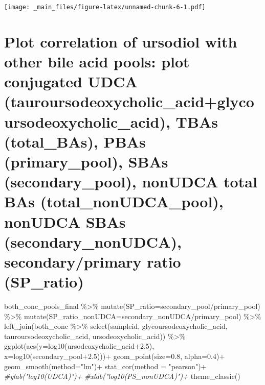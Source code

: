 \documentclass[
]{book}
\newenvironment{Shaded}{\begin{snugshade}}{\end{snugshade}}
\newcommand{\AttributeTok}[1]{\textcolor[rgb]{0.77,0.63,0.00}{#1}}
\newcommand{\CommentTok}[1]{\textcolor[rgb]{0.56,0.35,0.01}{\textit{#1}}}
\newcommand{\FloatTok}[1]{\textcolor[rgb]{0.00,0.00,0.81}{#1}}
\newcommand{\FunctionTok}[1]{\textcolor[rgb]{0.00,0.00,0.00}{#1}}
\newcommand{\NormalTok}[1]{#1}
\newcommand{\SpecialCharTok}[1]{\textcolor[rgb]{0.00,0.00,0.00}{#1}}
\newcommand{\StringTok}[1]{\textcolor[rgb]{0.31,0.60,0.02}{#1}}
\begin{document}
\texttt{[image: \_main\_files/figure-latex/unnamed-chunk-6-1.pdf]}

\hypertarget{plot-correlation-of-ursodiol-with-other-bile-acid-pools-plot-conjugated-udca-tauroursodeoxycholic_acidglycoursodeoxycholic_acid-tbas-total_bas-pbas-primary_pool-sbas-secondary_pool-nonudca-total-bas-total_nonudca_pool-nonudca-sbas-secondary_nonudca-secondaryprimary-ratio-sp_ratio}{%
\section{Plot correlation of ursodiol with other bile acid pools: plot conjugated UDCA (tauroursodeoxycholic\_acid+glycoursodeoxycholic\_acid), TBAs (total\_BAs), PBAs (primary\_pool), SBAs (secondary\_pool), nonUDCA total BAs (total\_nonUDCA\_pool), nonUDCA SBAs (secondary\_nonUDCA), secondary/primary ratio (SP\_ratio)}\label{plot-correlation-of-ursodiol-with-other-bile-acid-pools-plot-conjugated-udca-tauroursodeoxycholic_acidglycoursodeoxycholic_acid-tbas-total_bas-pbas-primary_pool-sbas-secondary_pool-nonudca-total-bas-total_nonudca_pool-nonudca-sbas-secondary_nonudca-secondaryprimary-ratio-sp_ratio}}

\begin{Shaded}
\begin{Highlighting}[]
\NormalTok{both\_conc\_pools\_final }\SpecialCharTok{\%\textgreater{}\%} 
  \FunctionTok{mutate}\NormalTok{(}\AttributeTok{SP\_ratio=}\NormalTok{secondary\_pool}\SpecialCharTok{/}\NormalTok{primary\_pool) }\SpecialCharTok{\%\textgreater{}\%} 
  \FunctionTok{mutate}\NormalTok{(}\AttributeTok{SP\_ratio\_nonUDCA=}\NormalTok{secondary\_nonUDCA}\SpecialCharTok{/}\NormalTok{primary\_pool) }\SpecialCharTok{\%\textgreater{}\%} 
  \FunctionTok{left\_join}\NormalTok{(both\_conc }\SpecialCharTok{\%\textgreater{}\%} \FunctionTok{select}\NormalTok{(sampleid, glycoursodeoxycholic\_acid, tauroursodeoxycholic\_acid, ursodeoxycholic\_acid)) }\SpecialCharTok{\%\textgreater{}\%} 
  \FunctionTok{ggplot}\NormalTok{(}\FunctionTok{aes}\NormalTok{(}\AttributeTok{y=}\FunctionTok{log10}\NormalTok{(}\StringTok{\textasciigrave{}}\AttributeTok{ursodeoxycholic\_acid}\StringTok{\textasciigrave{}}\SpecialCharTok{+}\FloatTok{2.5}\NormalTok{), }\AttributeTok{x=}\FunctionTok{log10}\NormalTok{(secondary\_pool}\FloatTok{+2.5}\NormalTok{)))}\SpecialCharTok{+}
  \FunctionTok{geom\_point}\NormalTok{(}\AttributeTok{size=}\FloatTok{0.8}\NormalTok{, }\AttributeTok{alpha=}\FloatTok{0.4}\NormalTok{)}\SpecialCharTok{+}
  \FunctionTok{geom\_smooth}\NormalTok{(}\AttributeTok{method=}\StringTok{"lm"}\NormalTok{)}\SpecialCharTok{+}
  \FunctionTok{stat\_cor}\NormalTok{(}\AttributeTok{method =} \StringTok{"pearson"}\NormalTok{)}\SpecialCharTok{+}
  \CommentTok{\#ylab("log10(UDCA)")+}
  \CommentTok{\#xlab("log10(PS\_nonUDCA)")+}
  \FunctionTok{theme\_classic}\NormalTok{()}
\end{Highlighting}
\end{Shaded}
\end{document}
